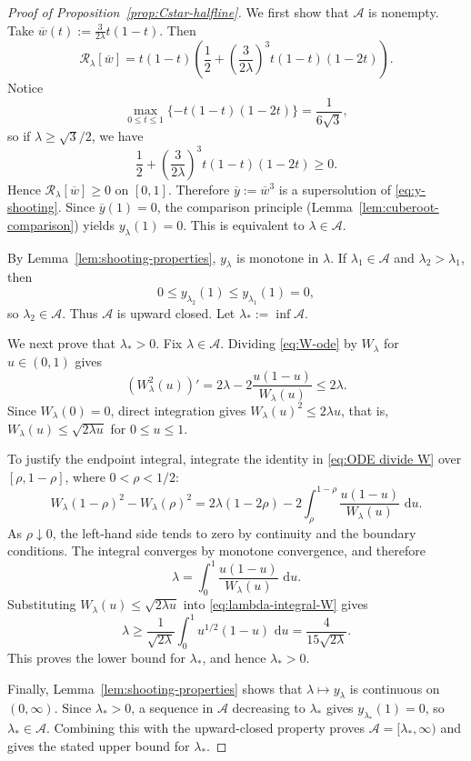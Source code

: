 \documentclass[12pt,preprint]{amsart}
\numberwithin{equation}{section}
\theoremstyle{plain}
\theoremstyle{definition}
\newcommand{\dd}{\,\mathrm d}
\begin{document}
\begin{proof}[Proof of Proposition~\ref{prop:Cstar-halfline}]
We first show that \(\mathcal A\) is nonempty. Take \(\overline w(t):=\frac{3}{2\lambda}t(1-t)\).
Then
\[
 \mathcal R_\lambda[\overline w]
 =t(1-t)\left(\frac{1}{2}+\left(\frac{3}{2\lambda}\right)^3t(1-t)(1-2t)\right).
\]
Notice
\[
 \max_{0\le t\le1}\{-t(1-t)(1-2t)\}=\frac1{6\sqrt3},
\]
so if \(\lambda\ge\sqrt3/2\), we have
\[
\frac{1}{2}+\left(\frac{3}{2\lambda}\right)^3t(1-t)(1-2t) \ge 0.
\]
Hence
\(\mathcal R_\lambda[\overline w]\ge0\) on \([0,1]\).  Therefore \(\overline y:=\overline w^3\) is a supersolution of
\eqref{eq:y-shooting}.  Since $\overline y(1)=0$, the comparison
principle (Lemma~\ref{lem:cuberoot-comparison}) yields
\(y_\lambda(1)=0\). This is equivalent to \(\lambda\in\mathcal A\).

By Lemma~\ref{lem:shooting-properties}, $y_\lambda$ is monotone in
$\lambda$.  If $\lambda_1\in\mathcal A$ and $\lambda_2>\lambda_1$, then
\[
 0\le y_{\lambda_2}(1)\le y_{\lambda_1}(1)=0,
\]
so $\lambda_2\in\mathcal A$.  Thus $\mathcal A$ is upward closed.  Let
$\lambda_*:=\inf\mathcal A$.

We next prove that $\lambda_*>0$.  Fix $\lambda\in\mathcal A$.  Dividing
\eqref{eq:W-ode} by $W_\lambda$ for $u\in(0,1)$ gives
\begin{equation}
 (W_\lambda^2(u))'
 =2\lambda-2\frac{u(1-u)}{W_\lambda(u)}
 \le2\lambda.
 \label{eq:ODE divide W}
\end{equation}
Since $W_\lambda(0)=0$, direct integration gives
$W_\lambda(u)^2\le2\lambda u$, that is,
$W_\lambda(u)\le\sqrt{2\lambda u}$ for $0\le u\le1$.

To justify the endpoint integral, integrate the identity in
\eqref{eq:ODE divide W} over $[\rho,1-\rho]$, where $0<\rho<1/2$:
\[
 W_\lambda(1-\rho)^2-W_\lambda(\rho)^2
 =2\lambda(1-2\rho)
  -2\int_\rho^{1-\rho}
      \frac{u(1-u)}{W_\lambda(u)}\,\dd u.
\]
As $\rho\downarrow0$, the left-hand side tends to zero by continuity and
the boundary conditions.  The integral converges by monotone convergence,
and therefore
\begin{equation}
 \lambda=\int_0^1\frac{u(1-u)}{W_\lambda(u)}\,\dd u.
 \label{eq:lambda-integral-W}
\end{equation}
Substituting $W_\lambda(u)\le\sqrt{2\lambda u}$ into
\eqref{eq:lambda-integral-W} gives
\[
 \lambda\ge\frac1{\sqrt{2\lambda}}
 \int_0^1u^{1/2}(1-u)\,\dd u
 =\frac4{15\sqrt{2\lambda}}.
\]
This proves the lower bound for $\lambda_*$, and hence
$\lambda_*>0$.

Finally, Lemma~\ref{lem:shooting-properties} shows that
$\lambda\mapsto y_\lambda$ is continuous on $(0,\infty)$.  Since
$\lambda_*>0$, a sequence in $\mathcal A$ decreasing to $\lambda_*$ gives
$y_{\lambda_*}(1)=0$, so $\lambda_*\in\mathcal A$.  Combining this with the
upward-closed property proves $\mathcal A=[\lambda_*,\infty)$ and gives the stated upper
bound for $\lambda_*$.
\end{proof}
\end{document}
